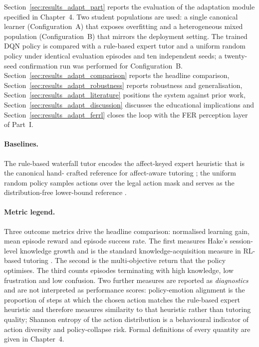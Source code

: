 Section~\ref{sec:results_adapt_part} reports the evaluation of
the adaptation module specified in Chapter~4. Two student
populations are used: a single canonical learner
(Configuration~A) that exposes overfitting and a heterogeneous
mixed population (Configuration~B) that mirrors the deployment
setting. The trained \ac{DQN} policy is compared with a rule-based
expert tutor and a uniform random policy under identical
evaluation episodes and ten independent seeds; a twenty-seed
confirmation run was performed for Configuration~B.
Section~\ref{sec:results_adapt_comparison} reports the headline
comparison, Section~\ref{sec:results_adapt_robustness} reports
robustness and generalisation,
Section~\ref{sec:results_adapt_literature} positions the system
against prior work, Section~\ref{sec:results_adapt_discussion}
discusses the educational implications and
Section~\ref{sec:results_adapt_ferrl} closes the loop with the
\ac{FER} perception layer of Part~I.

\paragraph{Baselines.} The rule-based waterfall tutor encodes
the affect-keyed expert heuristic that is the canonical hand-
crafted reference for affect-aware tutoring
\cite{woolf_affect-aware_2009,sayed_ai-based_2023}; the uniform
random policy samples actions over the legal action mask and
serves as the distribution-free lower-bound reference
\cite{kubotani_rltutor_2021,sanz_ausin_leveraging_2019}.

\paragraph{Metric legend.} Three outcome metrics drive the
headline comparison: normalised learning gain, mean episode
reward and episode success rate. The first measures Hake's
session-level knowledge growth \cite{hake_normalized_gain_1998}
and is the standard knowledge-acquisition measure in \ac{RL}-based
tutoring \cite{kubotani_rltutor_2021,su_leveraging_2024}. The
second is the multi-objective return that the policy optimises.
The third counts episodes terminating with high knowledge, low
frustration and low confusion. Two further measures are
reported as \emph{diagnostics} and are not interpreted as
performance scores: policy-emotion alignment is the proportion
of steps at which the chosen action matches the rule-based
expert heuristic and therefore measures similarity to that
heuristic rather than tutoring quality; Shannon entropy of the
action distribution is a behavioural indicator of action
diversity and policy-collapse risk. Formal definitions of every
quantity are given in Chapter~4.


